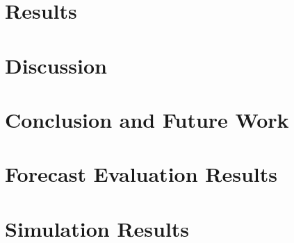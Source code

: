 \documentclass[a4paper,11pt,twoside]{memoir}
\begin{document}


\chapter{Results}
\label{ch:results}



\chapter{Discussion}
\label{ch:discussion}



\chapter{Conclusion and Future Work}
\label{ch:conclusion}




\appendix

\chapter{Forecast Evaluation Results}
\label{ch:appendix_forecast_results}




\chapter{Simulation Results}
\label{ch:appendix_simulation_results}





\backmatter



\end{document}
